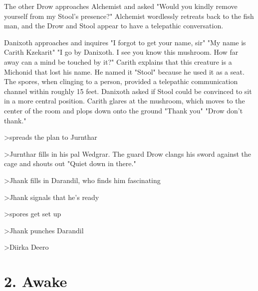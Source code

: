 \documentclass[letterpaper,10pt,twoside,twocolumn,openany]{book}
\begin{document}
The other Drow approaches Alchemist and asked "Would you kindly remove yourself from my Stool's presence?" Alchemist wordlessly retreats back to the fish man, and the Drow and Stool appear to have a telepathic conversation.

Danixoth approaches and inquires "I forgot to get your name, sir" "My name is Carith Kzekarit" "I go by Danixoth. I see you know this mushroom. How far away can a mind be touched by it?" Carith explains that this creature is a Michonid that lost his name. He named it "Stool" because he used it as a seat. The spores, when clinging to a person, provided a telepathic communication channel within roughly 15 feet. Danixoth asked if Stool could be convinced to sit in a more central position. Carith glares at the mushroom, which moves to the center of the room and plops down onto the ground "Thank you" "Drow don't thank."

>spreads the plan to Jurnthar

>Jurnthar fills in his pal Wedgrar. The guard Drow clangs his sword against the cage and shouts out "Quiet down in there."

>Jhank fills in Darandil, who finds him fascinating

>Jhank signals that he's ready 

>spores get set up

>Jhank punches Darandil

>Diirka Deero

\chapter{2. Awake}


\end{document}
